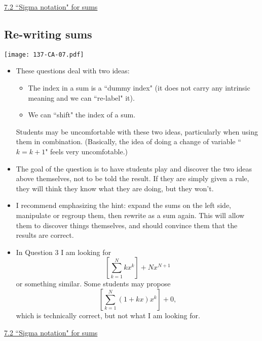 \documentclass[11pt]{article}
\newcommand{\nl}{\hfill \vspace{-1.1\baselineskip}} %
\newcommand{\vii}{\hspace{8mm} \href{https://www.youtube.com/watch?v=hZXPAEeu5D4&list=PLlwePzQY_wW9vqCkUudCmoOvnNmr9vMuJ&index=2}{7.2 ``Sigma notation" for sums}}
\begin{document}
\begin{videos}
\vii
\end{videos}

\newpage
\subsection{Re-writing sums}

\begin{center}
{ \texttt{[image: 137-CA-07.pdf]}} 
\end{center}

\begin{comments}
\nl
	\begin{itemize}
		\item These questions deal with two ideas:  
			\begin{itemize}
				\item The index in a sum is a ``dummy index" (it does not carry any intrinsic meaning and we can ``re-label" it).
				\item We can ``shift" the index of a sum.
			\end{itemize}
			Students may be uncomfortable with these two ideas, particularly when using them in combination.  (Basically, the idea of doing a change of variable ``$k=k+1$" feels very uncomfotable.)
			
		\item The goal of the question is to have students play and discover the two ideas above themselves, not to be told the result.  If they are simply given a rule, they will think they know what they are doing, but they won't.
		
		\item I recommend emphasizing the hint:  expand the sums on the left side, manipulate or regroup them, then rewrite as a sum again.   This will allow them to discover things themselves, and should convince them that the results are correct.
		
		\item In Question 3 I am looking for 
			$$
				\left[ \sum_{k=1}^{N}  k x^k \right] + Nx^{N+1}
			$$
			or something similar.  Some students may propose
			$$
				\left[ \sum_{k=1}^{N} (1+kx)x^{k} \right] + 0,
			$$
			which is technically correct, but not what I am looking for.
	\end{itemize}
\end{comments}

\begin{videos}
\vii
\end{videos}
\end{document}
